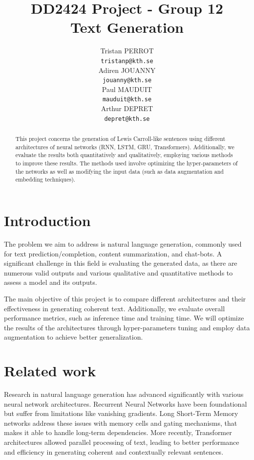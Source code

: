\documentclass{article}
\title{DD2424 Project - Group 12 \\ Text Generation}
\author{%
  Tristan PERROT \\
  \texttt{tristanp@kth.se} \\
  \And
  Adiren JOUANNY \\
  \texttt{jouanny@kth.se} \\
  \And
  Paul MAUDUIT \\
  \texttt{mauduit@kth.se} \\
  \And
  Arthur DEPRET \\
  \texttt{depret@kth.se} \\
}
\begin{document}
\maketitle


\begin{abstract}
  This project concerns the generation of Lewis Carroll-like sentences using different architectures of neural networks (RNN, LSTM, GRU, Transformers). Additionally, we evaluate the results both quantitatively and qualitatively, employing various methods to improve these results. The methods used involve optimizing the hyper-parameters of the networks as well as modifying the input data (such as data augmentation and embedding techniques).
\end{abstract}

\section{Introduction}

The problem we aim to address is natural language generation, commonly used for text prediction/completion, content summarization, and chat-bots. A significant challenge in this field is evaluating the generated data, as there are numerous valid outputs and various qualitative and quantitative methods to assess a model and its outputs.

The main objective of this project is to compare different architectures and their effectiveness in generating coherent text. Additionally, we evaluate overall performance metrics, such as inference time and training time. We will optimize the results of the architectures through hyper-parameters tuning and employ data augmentation to achieve better generalization.

\section{Related work}

Research in natural language generation has advanced significantly with various neural network architectures. Recurrent Neural Networks have been foundational but suffer from limitations like vanishing gradients. Long Short-Term Memory networks address these issues with memory cells and gating mechanisms, that makes it able to handle long-term dependencies. More recently, Transformer architectures allowed parallel processing of text, leading to better performance and efficiency in generating coherent and contextually relevant sentences. 
\end{document}
